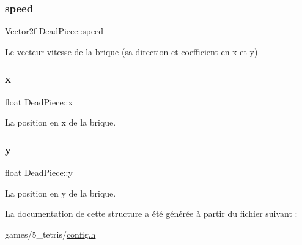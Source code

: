 \subsubsection{\texorpdfstring{speed}{speed}}
{\footnotesize\ttfamily Vector2f Dead\+Piece\+::speed}



Le vecteur vitesse de la brique (sa direction et coefficient en x et y) 

\mbox{\label{struct_dead_piece_a6ea3c8634975a90b9803f1b019fbe70e}} 
\subsubsection{\texorpdfstring{x}{x}}
{\footnotesize\ttfamily float Dead\+Piece\+::x}



La position en x de la brique. 

\mbox{\label{struct_dead_piece_aa4e4a5879eae22061e50009e94314955}} 
\subsubsection{\texorpdfstring{y}{y}}
{\footnotesize\ttfamily float Dead\+Piece\+::y}



La position en y de la brique. 



La documentation de cette structure a été générée à partir du fichier suivant \+:\begin{DoxyCompactItemize}
\item 
games/5\+\_\+tetris/\hyperlink{5__tetris_2config_8h}{config.\+h}\end{DoxyCompactItemize}
